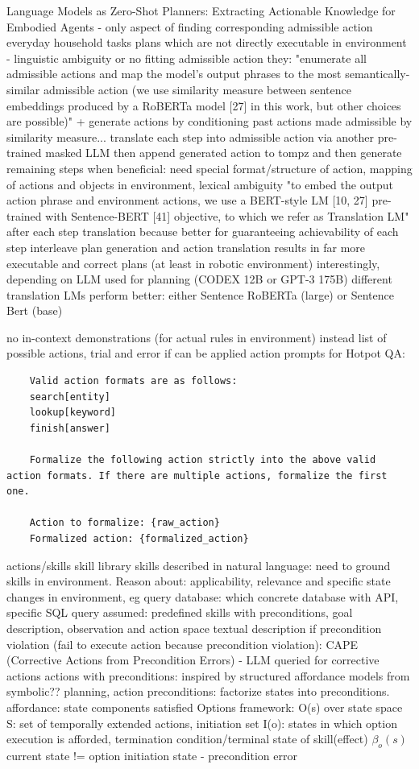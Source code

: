 \documentclass{article}
\begin{document}
\cite{huang_language_2022} Language Models as Zero-Shot Planners: Extracting Actionable Knowledge for Embodied Agents - only aspect of finding corresponding admissible action
everyday household tasks
plans which are not directly executable in environment - linguistic ambiguity or no fitting admissible action
they: "enumerate all admissible actions and map the model’s output phrases to the most semantically-similar admissible action (we use similarity measure between sentence embeddings produced by a RoBERTa model [27] in this work, but other choices are possible)"
+ generate actions by conditioning past actions made admissible by similarity measure...
translate each step into admissible action via another pre-trained masked LLM
then append generated action to tompz and then generate remaining steps
when beneficial: need special format/structure of action, mapping of actions and objects in environment, lexical ambiguity
"to embed the output action phrase and environment actions, we use a BERT-style LM [10, 27] pre-trained with Sentence-BERT [41] objective, to which we refer as Translation LM"
after each step translation because better for guaranteeing achievability of each step
interleave plan generation and action translation
results in far more executable and correct plans (at least in robotic environment)
interestingly, depending on LLM used for planning (CODEX 12B or GPT-3 175B) different translation LMs perform better: either Sentence RoBERTa (large) or Sentence Bert (base)

\cite{ouyang_autoplan_2023}
no in-context demonstrations (for actual rules in environment)
instead list of possible actions, trial and error if can be applied
action prompts for Hotpot QA:
\begin{verbatim}
	Valid action formats are as follows: 
	search[entity] 
	lookup[keyword] 
	finish[answer] 
	
	Formalize the following action strictly into the above valid action formats. If there are multiple actions, formalize the first one. 
	
	Action to formalize: {raw_action} 
	Formalized action: {formalized_action}
\end{verbatim}

\cite{raman_cape_2023} actions/skills
skill library
skills described in natural language: need to ground skills in environment. Reason about: applicability, relevance and specific state changes in environment, eg query database: which concrete database with API, specific SQL query
assumed: predefined skills with preconditions, goal description, observation and action space textual description
if precondition violation (fail to execute action because precondition violation): CAPE (Corrective Actions from Precondition Errors) -  LLM queried for corrective actions
actions with preconditions:
inspired by structured affordance models from symbolic?? planning, action preconditions: factorize states into preconditions. affordance: state components satisfied
Options framework: O(s) over state space S: set of temporally extended actions, initiation set I(o): states in which option execution is afforded, termination condition/terminal state of skill(effect) $\beta_o (s)$
current state != option initiation state - precondition error
\end{document}
